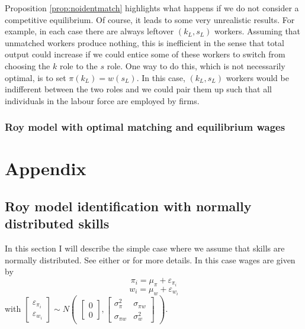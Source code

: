 \documentclass[12 pt]{article}
\begin{document}
Proposition \ref{prop:noidentmatch} highlights what happens if we do not consider a competitive equilibrium. Of course, it leads to some very unrealistic results. For example, in each case there are always leftover $(k_L,s_L)$ workers. Assuming that unmatched workers produce nothing, this is inefficient in the sense that total output could increase if we could entice some of these workers to switch from choosing the $k$ role to the $s$ role. One way to do this, which is not necessarily optimal, is to set $\pi(k_L) = w(s_L)$. In this case, $(k_L,s_L)$ workers would be indifferent between the two roles and we could pair them up such that all individuals in the labour force are employed by firms.

\subsubsection{Roy model with optimal matching and equilibrium wages}



\newpage



\newpage
\setcounter{section}{0}
\renewcommand{\thesection}{\Alph{section}}
\renewcommand\theequation{\thesection\arabic{equation}}
\section{Appendix}
\subsection{Roy model identification with normally distributed skills}

In this section I will describe the simple case where we assume that skills are normally distributed. See either \citet{heckman1990empirical} or \citet{french2011identification} for more details. In this case wages are given by
\begin{equation}
	\pi_i = \mu_\pi + \varepsilon_{\pi_i}
	\label{eqn:pi_simple_app}
\end{equation}
\begin{equation}
	w_i = \mu_w + \varepsilon_{w_i}
	\label{eqn:w_simple_app}
\end{equation}
with $\begin{bmatrix}
	\varepsilon_{\pi_i}\\
	\varepsilon_{w_i}
\end{bmatrix} \sim N \begin{pmatrix}
	\begin{bmatrix}
		0\\
		0
	\end{bmatrix},
	\begin{bmatrix}
		\sigma_\pi^2 & \sigma_{\pi w}\\
		\sigma_{\pi w} & \sigma_w^2 
	\end{bmatrix}
\end{pmatrix}$.
\end{document}
